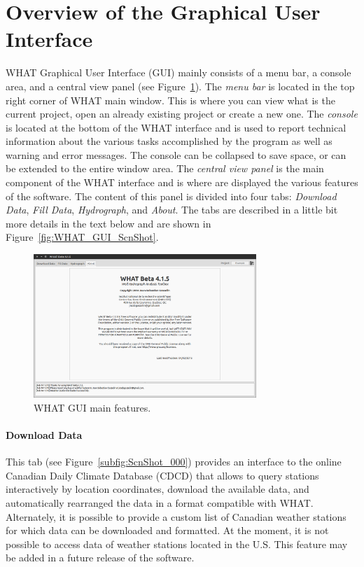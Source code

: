 \documentclass[WHATMANUAL.tex]{subfiles}
\begin{document}
\section{Overview of the Graphical User Interface}
\label{sec:GUI_overview}


WHAT Graphical User Interface (GUI) mainly consists of a menu bar, a console area, and a central view panel (see Figure~\ref{fig:WHAT_GUI}). The \emph{menu bar} is located in the top right corner of WHAT main window. This is where you can view what is the current project, open an already existing project or create a new one. The \emph{console} is located at the bottom of the WHAT interface and is used to report technical information about the various tasks accomplished by the program as well as warning and error messages. The console can be collapsed to save space, or can be extended to the entire window area. The \emph{central view panel} is the main component of the WHAT interface and is where are displayed the various features of the software. The content of this panel is divided into four tabs: \emph{Download Data}, \emph{Fill Data}, \emph{Hydrograph}, and \emph{About}. The tabs are described in a little bit more details in the text below and are shown in Figure~\ref{fig:WHAT_GUI_ScnShot}.

\begin{figure}[!ht]
\centering
\includegraphics[width=0.75\textwidth]{img/WHAT_GUI}
\caption[WHAT GUI main features.]{WHAT GUI main features.}
\label{fig:WHAT_GUI}
\end{figure}

\newpage

\paragraph{Download Data} This tab (see Figure~\ref{subfig:ScnShot_000}) provides an interface to the online Canadian Daily Climate Database (CDCD) that allows to query stations interactively by location coordinates, download the available data, and automatically rearranged the data in a format compatible with WHAT. Alternately, it is possible to provide a custom list of Canadian weather stations for which data can be downloaded and formatted. At the moment, it is not possible to access data of weather stations located in the U.S. This feature may be added in a future release of the software.
\end{document}
